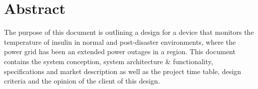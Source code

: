 \section*{Abstract}
The purpose of this document is outlining a design for a device that monitors the temperature of insulin in normal and post-disaster environments, where the power grid has been an extended power outages in a region. This document contains the system conception, system architecture \& functionality, specifications and market description as well as the project time table, design criteria and the opinion of the client of this design.
